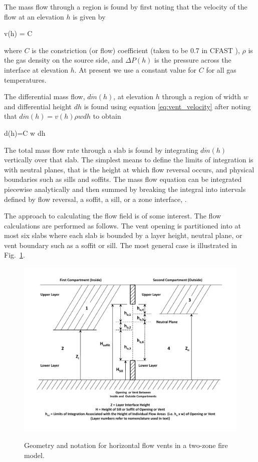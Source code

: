 The mass flow through a region is found by first noting that the
velocity of the flow at an elevation $h$ is given by

\newcommand{\dmass}{d\dot{m}}
\be
v(h) = C 
\label{eq:vent_velocity}
\ee

\noindent where $C$ is the constriction (or flow) coefficient (taken to be 0.7 in CFAST \cite{Steckler_Coefficients}), $\rho$ is the gas density on the source side, and $\Delta P(h)$ is the pressure across the interface
at elevation $h$.  At present we use a constant value for $C$ for all gas temperatures.

The differential mass flow, $\dmass(h)$, at elevation $h$ through a region of width $w$ and differential height $dh$ is found using equation \ref{eq:vent_velocity} after noting that $\dmass(h)=v(h)\rho wdh$
to obtain

\be
\dmass(h)=C w dh
\label{eq:vent_massflow}
\ee

The total mass flow rate through a slab is found by integrating $\dmass(h)$ vertically over that slab.
The simplest means to define the limits of integration is with neutral planes, that is the height at which flow reversal occurs, and physical boundaries such as sills and soffits.  The mass flow equation can be integrated piecewise analytically and then summed by breaking the integral into intervals defined by flow reversal, a soffit, a sill, or a zone interface, .

The approach to calculating the flow field is of some interest.  The flow calculations are performed as follows.  The vent opening is partitioned into at most six slabs where each slab is bounded by a layer height, neutral plane, or vent boundary such as a soffit or sill.  The most general case is illustrated in Fig.~\ref{fig:Flow_Notation}.

\begin{figure}[t]
\begin{center}
\includegraphics[width=6.0in]{FIGURES/Theory/Flow_Notation}\\
\end{center}
\caption{Geometry and notation for horizontal flow vents in a two-zone fire model.}
 \label{fig:Flow_Notation}
\end{figure}

